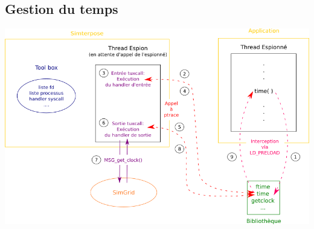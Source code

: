 \documentclass[10.5pt]{beamer}
\begin{document}
\subsection{Gestion du temps}
\begin{frame}{\subsecname}
  \includegraphics[scale=0.4]{Pictures/png/Open_pandor}
\end{frame}
\end{document}
